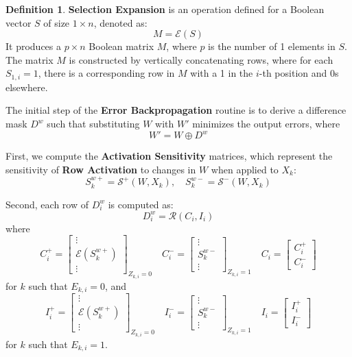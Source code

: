 \documentclass{article}
\theoremstyle{definition}
\newtheorem*{definition}{Definition}
\theoremstyle{remark}
\begin{document}
\begin{definition}
    \textbf{Selection Expansion} is an operation defined for a Boolean vector \( S \) of size \( 1 \times n \), denoted as:
    \[ M = \mathcal{E}(S) \]
    It produces a \( p \times n \) Boolean matrix \( M \), where \( p \) is the number of 1 elements in \( S \). The matrix \( M \) is constructed by vertically concatenating rows, where for each \( S_{1,i} = 1 \), there is a corresponding row in \( M \) with a 1 in the \( i \)-th position and 0s elsewhere.
\end{definition}

The initial step of the \textbf{Error Backpropagation} routine is to derive a difference mask \( D^w \) such that substituting \( W \) with \( W' \) minimizes the output errors, where
\[ W' = W \oplus D^w \]

First, we compute the \textbf{Activation Sensitivity} matrices, which represent the sensitivity of \textbf{Row Activation} to changes in \( W \) when applied to \( X_k \):
\[ S^{w+}_k = \mathcal{S^+}(W, X_k), \quad S^{w-}_k = \mathcal{S^-}(W, X_k) \]

Second, each row of \( D^w_i \) is computed as:
\[ D^w_i = \mathcal{R}(C_i, I_i) \]
where
\[
    C^+_i = \begin{bmatrix} \vdots \\ \mathcal{E}(S^{w+}_k) \\ \vdots \end{bmatrix}_{Z_{k,i} = 0} \quad
    C^-_i = \begin{bmatrix} \vdots \\ S^{w-}_k \\ \vdots \end{bmatrix}_{Z_{k,i} = 1} \quad
    C_i = \begin{bmatrix} C^+_i \\ C^-_i \end{bmatrix}
\]
for \( k \) such that \( E_{k,i} = 0 \), and
\[
    I^+_i = \begin{bmatrix} \vdots \\ \mathcal{E}(S^{w+}_k) \\ \vdots \end{bmatrix}_{Z_{k,i} = 0} \quad
    I^-_i = \begin{bmatrix} \vdots \\ S^{w-}_k \\ \vdots \end{bmatrix}_{Z_{k,i} = 1} \quad
    I_i = \begin{bmatrix} I^+_i \\ I^-_i \end{bmatrix}
\]
for \( k \) such that \( E_{k,i} = 1 \).
\end{document}

